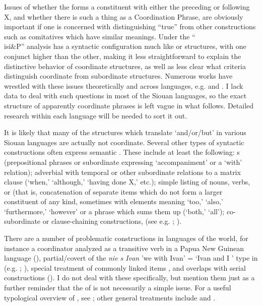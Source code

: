 \documentclass[output=paper]{LSP/langsci}
\begin{document}
Issues of whether the  forms a constituent with either the preceding or following X, and whether there is such a thing as a Coordination Phrase, are obviously important if one is concerned with distinguishing ``true''  from other constructions such as comitatives which have similar meanings. Under the ``\\isi{\&P}'' analysis  has a syntactic configuration much like  or  structures, with one conjunct higher than the other, making it less straightforward to explain the distinctive behavior of coordinate structures, as well as less clear what criteria distinguish coordinate from subordinate structures. Numerous works have wrestled with these issues theoretically and across languages, e.g. \citet{Wesche1995} and  \citet{FabriciusHansenRamm2008}. I lack data to deal with such questions in most of the Siouan languages, so the exact structure of apparently coordinate phrases is left vague in what follows. Detailed research within each language will be needed to sort it out.

It is likely that many of the structures which translate `and/or/but' in various Siouan languages are actually not coordinate. Several other types of syntactic constructions often express semantic . These include at least the following:  s (prepositional phrases or subordinate  expressing `accompaniment' or a `with' relation);  adverbial  with temporal or other subordinate relations to a matrix clause (`when,' `although,' `having done X,' etc.);  simple listing of nouns, verbs, or  (that is, concatenation of separate items which do not form a larger constituent of any kind, sometimes with elements meaning `too,' `also,' `furthermore,' `however' or a phrase which sums them up (`both,' `all');  co-subordinate or clause-chaining constructions, (see e.g. \citealt{Graczyk2007}; \citealt{Boyle2007}).

There are a number of problematic  constructions in languages of the world, for instance a coordinator analyzed as a transitive verb in a Papua New Guinean language (\citealt{BrownDryer2009}), partial/covert  of the \textit{nie s Ivan} 'we with Ivan' = `Ivan and I ' type in  (e.g. \citealt{McNally1993}; \citealt{Larson2014}), special treatment of commonly linked items \citep{Walchli2005}, and overlaps with serial constructions (\citealt{Carstens2002}). I do not deal with these specifically, but mention them just as a further reminder that the  of  is not necessarily a simple issue. For a useful typological overview of , see \citet{Haspelmath2007}; other general treatments include \citet{Johannessen1998} and  \citet{VanOirsouw1987}. 
\end{document}

